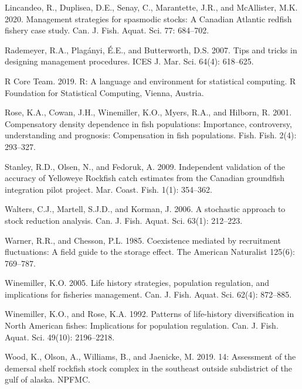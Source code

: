 \documentclass[11pt]{book}
\begin{document}
\leavevmode\hypertarget{ref-lincandeo2020}{}%
Lincandeo, R., Duplisea, D.E., Senay, C., Marantette, J.R., and McAllister, M.K. 2020. Management strategies for spasmodic stocks: A Canadian Atlantic redfish fishery case study. Can. J. Fish. Aquat. Sci. 77: 684--702.

\leavevmode\hypertarget{ref-rademeyer2007}{}%
Rademeyer, R.A., Plagányi, É.E., and Butterworth, D.S. 2007. Tips and tricks in designing management procedures. ICES J. Mar. Sci. 64(4): 618--625.

\leavevmode\hypertarget{ref-r2019}{}%
R Core Team. 2019. R: A language and environment for statistical computing. R Foundation for Statistical Computing, Vienna, Austria.

\leavevmode\hypertarget{ref-rose2001}{}%
Rose, K.A., Cowan, J.H., Winemiller, K.O., Myers, R.A., and Hilborn, R. 2001. Compensatory density dependence in fish populations: Importance, controversy, understanding and prognosis: Compensation in fish populations. Fish. Fish. 2(4): 293--327.

\leavevmode\hypertarget{ref-stanley2009}{}%
Stanley, R.D., Olsen, N., and Fedoruk, A. 2009. Independent validation of the accuracy of Yelloweye Rockfish catch estimates from the Canadian groundfish integration pilot project. Mar. Coast. Fish. 1(1): 354--362.

\leavevmode\hypertarget{ref-walters2006}{}%
Walters, C.J., Martell, S.J.D., and Korman, J. 2006. A stochastic approach to stock reduction analysis. Can. J. Fish. Aquat. Sci. 63(1): 212--223.

\leavevmode\hypertarget{ref-warner1985}{}%
Warner, R.R., and Chesson, P.L. 1985. Coexistence mediated by recruitment fluctuations: A field guide to the storage effect. The American Naturalist 125(6): 769--787.

\leavevmode\hypertarget{ref-winemiller2005}{}%
Winemiller, K.O. 2005. Life history strategies, population regulation, and implications for fisheries management. Can. J. Fish. Aquat. Sci. 62(4): 872--885.

\leavevmode\hypertarget{ref-winemiller1992}{}%
Winemiller, K.O., and Rose, K.A. 1992. Patterns of life-history diversification in North American fishes: Implications for population regulation. Can. J. Fish. Aquat. Sci. 49(10): 2196--2218.

\leavevmode\hypertarget{ref-wood2019}{}%
Wood, K., Olson, A., Williams, B., and Jaenicke, M. 2019. 14: Assessment of the demersal shelf rockfish stock complex in the southeast outside subdistrict of the gulf of alaska. NPFMC.
\end{document}
